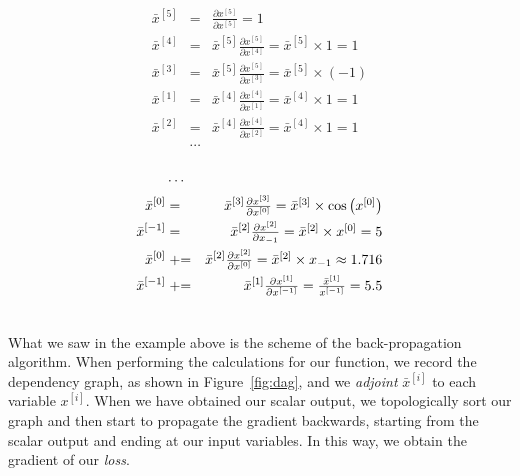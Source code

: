 \documentclass[pdflatex,sn-mathphys-num]{sn-jnl}%
\theoremstyle{thmstyleone}%
\theoremstyle{thmstyletwo}%
\theoremstyle{thmstylethree}%
\begin{document}
\begingroup
\renewcommand{\partialfrac}[2]{\textstyle\frac{\partial#1}{\partial#2}}
\begin{minipage}{.4\textwidth}
\begin{eqnarray*}
    \bar x^{[5]}    &=& \partialfrac{x^{[5]}}{x^{[5]}}
        = 1 \\
    \bar x^{[4]}    &=& \bar x^{[5]}\partialfrac{x^{[5]}}{x^{[4]}}
        = \bar x^{[5]} \times 1 = 1 \\
    \bar x^{[3]}    &=& \bar x^{[5]}\partialfrac{x^{[5]}}{x^{[3]}}
        = \bar x^{[5]} \times (-1) \\ %
    \bar x^{[1]}    &=& \bar x^{[4]}\partialfrac{x^{[4]}}{x^{[1]}}
        = \bar x^{[4]} \times 1 = 1 \\
    \bar x^{[2]}    &=& \bar x^{[4]}\partialfrac{x^{[4]}}{x^{[2]}}
        = \bar x^{[4]} \times 1 = 1 \\
                    &\cdots& \\
\end{eqnarray*}
\end{minipage}%
\hspace{.7cm}
\begin{minipage}{.5\textwidth}
\begin{eqnarray*}
                    &\cdots& \\
    \bar x^{[0]}    &=& \bar x^{[3]}\partialfrac{x^{[3]}}{x^{[0]}}
        = \bar x^{[3]} \times \cos\left(x^{[0]}\right) \\ %
    \bar x^{[-1]} &=& \bar x^{[2]}\partialfrac{x^{[2]}}{x_{-1}}
        = \bar x^{[2]} \times x^{[0]} = 5 \\
    \bar x^{[0]}    &\pluseq& \bar x^{[2]}\partialfrac{x^{[2]}}{x^{[0]}}
        = \bar x^{[2]} \times x_{-1} \approx 1.716 \\
    \bar x^{[-1]} &\pluseq& \bar x^{[1]}\partialfrac{x^{[1]}}{x^{[-1]}}
        = \frac{\bar x^{[1]}}{x^{[-1]}} = 5.5 \\
                  && \\
\end{eqnarray*}
\end{minipage}
\endgroup

What we saw in the example above is the scheme of the back-propagation
algorithm.  When performing the calculations for our function, we record the
dependency graph, as shown in Figure~\ref{fig:dag}, and we \emph{adjoint} \(\bar
x^{[i]}\) to each variable \(x^{[i]}\). When we have obtained our scalar output,
we topologically sort our graph and then start to propagate the gradient
backwards, starting from the scalar output and ending at our input variables. In
this way, we obtain the gradient of our \emph{loss}.
\end{document}
